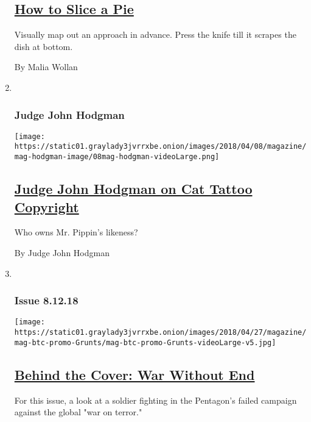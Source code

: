 \begin{enumerate}
  \hypertarget{how-to-slice-a-pie}{%
  \subsection{\texorpdfstring{\href{/2018/08/09/magazine/how-to-slice-a-pie.html}{How
  to Slice a Pie}}{How to Slice a Pie}}\label{how-to-slice-a-pie}}

  Visually map out an approach in advance. Press the knife till it
  scrapes the dish at bottom.

  By Malia Wollan
\item ~
  \hypertarget{judge-john-hodgman}{%
  \subsubsection{Judge John Hodgman}\label{judge-john-hodgman}}

  \texttt{[image: https://static01.graylady3jvrrxbe.onion/images/2018/04/08/magazine/mag-hodgman-image/08mag-hodgman-videoLarge.png]}

  \hypertarget{judge-john-hodgman-on-cat-tattoo-copyright}{%
  \subsection{\texorpdfstring{\href{/2018/08/09/magazine/judge-john-hodgman-on-cat-tattoo-copyright.html}{Judge
  John Hodgman on Cat Tattoo
  Copyright}}{Judge John Hodgman on Cat Tattoo Copyright}}\label{judge-john-hodgman-on-cat-tattoo-copyright}}

  Who owns Mr. Pippin's likeness?

  By Judge John Hodgman
\item ~
  \hypertarget{issue-81218}{%
  \subsubsection{Issue 8.12.18}\label{issue-81218}}

  \texttt{[image: https://static01.graylady3jvrrxbe.onion/images/2018/04/27/magazine/mag-btc-promo-Grunts/mag-btc-promo-Grunts-videoLarge-v5.jpg]}

  \hypertarget{behind-the-cover-war-without-end}{%
  \subsection{\texorpdfstring{\href{/2018/08/08/magazine/behind-the-cover-war-without-end.html}{Behind
  the Cover: War Without
  End}}{Behind the Cover: War Without End}}\label{behind-the-cover-war-without-end}}

  For this issue, a look at a soldier fighting in the Pentagon's failed
  campaign against the global "war on terror."
\end{enumerate}

